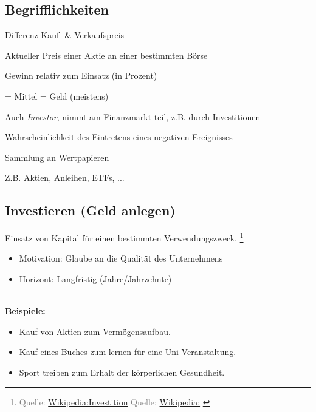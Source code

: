 \documentclass{beamer}
\newcommand{\n}{\hfill\\\vspace{0.25cm}}
\let\oldfootnote\footnote
\renewcommand{\footnote}[1]
{%
	\oldfootnote
	{
		\tiny
		\textcolor{gray}{#1}
	}%
}
\newcommand{\citewiki}[2][]
{%
	\footnote
	{
		\ifthenelse{\isempty{#1}}
		{
			Quelle: \href{https://de.wikipedia.org/wiki/#2}{Wikipedia:#2}
		}
		{
			Quelle: \href{https://de.wikipedia.org/wiki/#2}{Wikipedia:#1}
		}
	}
}
\begin{document}
		\begin{frame}
		\end{frame}
	
		\subsection{Begrifflichkeiten}
		
		\begin{frame}
			\begin{description}[labelwidth=0cm]
				\item[Gewinn/Verlust] Differenz Kauf- \& Verkaufspreis\pause
				\item[Kurs] Aktueller Preis einer Aktie an einer bestimmten Börse\pause
				\item[Rendite] Gewinn relativ zum Einsatz (in Prozent)\pause
				\item[Kapital] = Mittel = Geld (meistens)\pause
				\item[Anleger] Auch \textit{Investor}, nimmt am Finanzmarkt teil, z.B. durch Investitionen\pause
				\item[Risiko] Wahrscheinlichkeit des Eintretens eines negativen Ereignisses\pause
				\item[Portfolio] Sammlung an Wertpapieren
				\item[Wertpapier] Z.B. Aktien, Anleihen, ETFs, ...
			\end{description}
		\end{frame}
		
		\subsection{Investieren (Geld anlegen)}
		
			\begin{frame}
				\begin{definition}
					Einsatz von Kapital für einen bestimmten Verwendungszweck.\citewiki{Investition}
				\end{definition}
				\begin{itemize}
					\item Motivation: Glaube an die Qualität des Unternehmens
					\item Horizont: Langfristig (Jahre/Jahrzehnte)
				\end{itemize}\n
				\textbf{Beispiele:}
				\begin{itemize}
					\item Kauf von Aktien zum Vermögensaufbau.
					\item Kauf eines Buches zum lernen für eine Uni-Veranstaltung.
					\item Sport treiben zum Erhalt der körperlichen Gesundheit.
				\end{itemize}
			\end{frame}
		
\end{document}
